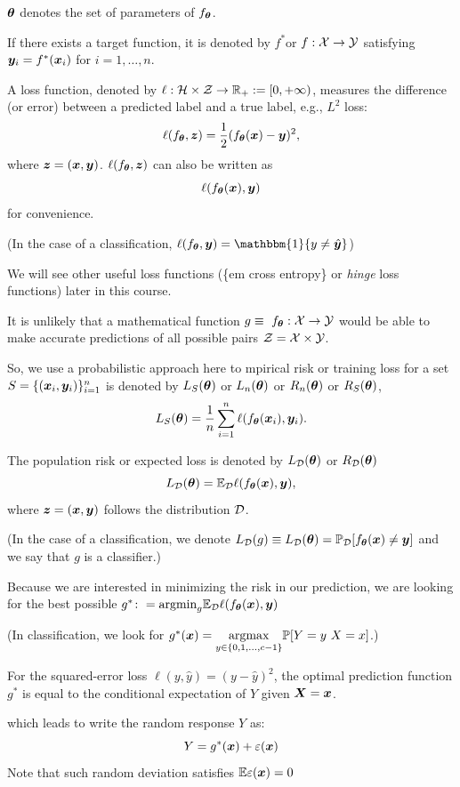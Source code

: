 \documentclass{beamer}
\begin{document}
\begin{frame}[allowframebreaks]
  $\bm{\theta}$  denotes the set of parameters of $f_{\bm{\theta}}$.
  
  If there exists a target function, it is denoted by $f^*$or $f:\mathcal{X}\to\mathcal{Y}$ satisfying $\bm{y}_i=f^*(\bm{x}_i)$ for $i=1,\ldots,n$.
  
  A loss function, denoted by $\ell:\mathcal{H}\times\mathcal{Z}\to\mathbb{R}_+:=[0,+\infty)$, measures the difference (or error) between a predicted label and a true label, e.g., $L^2$ loss:
  \[
      \ell(f_{\bm{\theta}},\bm{z})=\frac{1}{2}(f_{\bm{\theta}}(\bm{x})-\bm{y})^2,
  \]
  where $\bm{z}=(\bm{x},\bm{y})$. $\ell(f_{\bm{\theta}},\bm{z})$ can also be written as
  \[
      \ell(f_{\bm{\theta}}(\bm{x}),\bm{y})
  \]
  for convenience.
  
  (In the case of a classification, $\ell(f_{\vtheta},\vy)=\mathbbm{1}\{y\neq \hat{\vy}\}$)

We will see other useful loss functions (\{em cross entropy\} or {\em hinge} loss functions) later in this course.

It is unlikely that a mathematical function $g \equiv \ f_{\bm{\theta}}:\mathcal{X}\to\mathcal{Y}$ would be able to make accurate predictions of all possible pairs $\mathcal{Z}=\mathcal{X}\times\mathcal{Y}$.

  So, we use a probabilistic approach here to mpirical risk or training loss for a set $S=\{(\bm{x}_i,\bm{y}_i)\}_{i=1}^{n}$ is denoted by  $L_S(\bm{\theta})$ or $L_{n}(\bm{\theta})$ or $R_{n}(\bm{\theta})$ or $R_{S}(\bm{\theta})$,
  \begin{equation}
      L_S(\bm{\theta}) =\frac{1}{n}\sum_{i=1}^n\ell(f_{\bm{\theta}}(\bm{x}_i),\bm{y}_i).
  \end{equation}
  
  The population risk or expected loss is denoted by $L_{\mathcal{D}}(\bm{\theta})$ or $R_{\mathcal{D}}(\bm{\theta})$
  \begin{equation}
      L_{\mathcal{D}}(\bm{\theta}) =\mathbb{E}_{\mathcal{D}}\ell(f_{\bm{\theta}}(\bm{x}),\bm{y}),
  \end{equation}
  where $\bm{z}=(\bm{x},\bm{y})$ follows the distribution $\mathcal{D}$.
   
  (In the case of a classification, we denote $L_{\mathcal{D}}(g) \equiv L_{\mathcal{D}}(\bm{\theta}) = \mathbb{P}_{\mathcal{D}} [f_{\bm{\theta}}(\bm{x}) \neq \bm{y}]$ and we say that $g$ is a classifier.)

  Because we are interested in minimizing the risk in our prediction, we are looking for the best possible $g^* \colon = \mathrm{argmin}_g \mathbb{E}_{\mathcal{D}}\ell(f_{\bm{\theta}}(\bm{x}),\bm{y})$

  (In classification, we look for $g^* (\vx) = \underset{y\in\{0,1,\ldots,c-1\}}{\mathrm{argmax}}  \Prob[Y=y \ X=x]$.)

  \begin{theorem}
    For the squared-error loss $\ell (y,\hat{y})=(y-\hat{y})^2$, the optimal prediction function $g^*$ is equal to the conditional expectation of $Y$ given $\bm{X}=\bm{x}$.
  \end{theorem}
  which leads to write the random response $Y$ as:
  \[Y=g^*(\bm{x})+\varepsilon(\bm{x})\]
  Note that such random deviation satisfies $\mathbb{E} \varepsilon(\bm{x})=0$
\end{frame}


\end{document}
